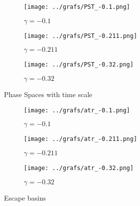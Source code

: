 \documentclass[12pt, a4paper]{article}
\begin{document}
\begin{figure}[!h]
     \centering
     \begin{subfigure}[b]{0.3\textwidth}
         \centering
         \texttt{[image: ../grafs/PST\_-0.1.png]}
         \caption{$\gamma=-0.1$}
         \label{fig:y equals x}
     \end{subfigure}
     \hfill
     \begin{subfigure}[b]{0.3\textwidth}
         \centering
         \texttt{[image: ../grafs/PST\_-0.211.png]}
         \caption{$\gamma=-0.211$}
         \label{fig:three sin x}
     \end{subfigure}
     \hfill
     \begin{subfigure}[b]{0.3\textwidth}
         \centering
         \texttt{[image: ../grafs/PST\_-0.32.png]}
         \caption{$\gamma=-0.32$}
         \label{fig:five over x}
     \end{subfigure}
        \caption{Phase Spaces with time scale}
        \label{fig:three graphs}
\end{figure}



\begin{figure}[!h]
     \centering
     \begin{subfigure}[b]{0.3\textwidth}
         \centering
         \texttt{[image: ../grafs/atr\_-0.1.png]}
         \caption{$\gamma=-0.1$}
         \label{fig:y equals x}
     \end{subfigure}
     \hfill
     \begin{subfigure}[b]{0.3\textwidth}
         \centering
         \texttt{[image: ../grafs/atr\_-0.211.png]}
         \caption{$\gamma=-0.211$}
         \label{fig:three sin x}
     \end{subfigure}
     \hfill
     \begin{subfigure}[b]{0.3\textwidth}
         \centering
         \texttt{[image: ../grafs/atr\_-0.32.png]}
         \caption{$\gamma=-0.32$}
         \label{fig:five over x}
     \end{subfigure}
        \caption{Escape basins}
        \label{fig:three graphs}
\end{figure}
\end{document}
